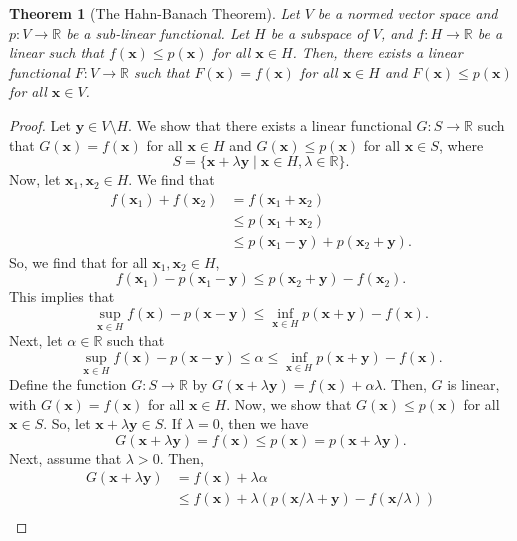 \documentclass[a4paper, openany]{memoir}
\theoremstyle{definition}
\theoremstyle{plain}
\newtheorem{theorem}[definition]{Theorem}
\begin{document}
    \begin{theorem}[The Hahn-Banach Theorem]
        Let $V$ be a normed vector space and $p: V \to \mathbb{R}$ be a sub-linear functional. Let $H$ be a subspace of $V$, and $f: H \to \mathbb{R}$ be a linear such that $f(\bm{x}) \leq p(\bm{x})$ for all $\bm{x} \in H$. Then, there exists a linear functional $F: V \to \mathbb{R}$ such that $F(\bm{x}) = f(\bm{x})$ for all $\bm{x} \in H$ and $F(\bm{x}) \leq p(\bm{x})$ for all $\bm{x} \in V$.
    \end{theorem}
    \begin{proof}
        Let $\bm{y} \in V \setminus H$. We show that there exists a linear functional $G: S \to \mathbb{R}$ such that $G(\bm{x}) = f(\bm{x})$ for all $\bm{x} \in H$ and $G(\bm{x}) \leq p(\bm{x})$ for all $\bm{x} \in S$, where
        \[S = \{\bm{x} + \lambda \bm{y} \mid \bm{x} \in H, \lambda \in \mathbb{R}\}.\]
        Now, let $\bm{x}_1, \bm{x}_2 \in H$. We find that 
        \begin{align*}
            f(\bm{x}_1) + f(\bm{x}_2) &= f(\bm{x}_1 + \bm{x}_2) \\
            &\leq p(\bm{x}_1 + \bm{x}_2) \\
            &\leq p(\bm{x}_1 - \bm{y}) + p(\bm{x}_2 + \bm{y}).
        \end{align*}
        So, we find that for all $\bm{x}_1, \bm{x}_2 \in H$,
        \[f(\bm{x}_1) - p(\bm{x}_1 - \bm{y}) \leq p(\bm{x}_2 + \bm{y}) - f(\bm{x}_2).\]
        This implies that
        \[\sup_{\bm{x} \in H} f(\bm{x}) - p(\bm{x} - \bm{y}) \leq \inf_{\bm{x} \in H} p(\bm{x} + \bm{y}) - f(\bm{x}).\]
        Next, let $\alpha \in \mathbb{R}$ such that
        \[\sup_{\bm{x} \in H} f(\bm{x}) - p(\bm{x} - \bm{y}) \leq \alpha \leq \inf_{\bm{x} \in H} p(\bm{x} + \bm{y}) - f(\bm{x}).\]
        Define the function $G: S \to \mathbb{R}$ by $G(\bm{x} + \lambda \bm{y}) = f(\bm{x}) + \alpha \lambda$. Then, $G$ is linear, with $G(\bm{x}) = f(\bm{x})$ for all $\bm{x} \in H$. Now, we show that $G(\bm{x}) \leq p(\bm{x})$ for all $\bm{x} \in S$. So, let $\bm{x} + \lambda \bm{y} \in S$. If $\lambda = 0$, then we have 
        \[G(\bm{x} + \lambda \bm{y}) = f(\bm{x}) \leq p(\bm{x}) = p(\bm{x} + \lambda \bm{y}).\]
        Next, assume that $\lambda > 0$. Then,
        \begin{align*}
            G(\bm{x} + \lambda \bm{y}) &= f(\bm{x}) + \lambda \alpha \\
            &\leq f(\bm{x}) + \lambda (p(\bm{x}/\lambda + \bm{y}) - f(\bm{x}/\lambda)) \\

\end{align*}
\end{proof}
\end{document}
